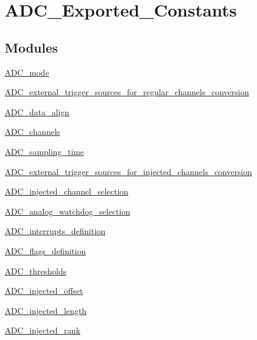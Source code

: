 \hypertarget{group___a_d_c___exported___constants}{\section{A\-D\-C\-\_\-\-Exported\-\_\-\-Constants}
\label{group___a_d_c___exported___constants}
}
\subsection*{Modules}
\begin{DoxyCompactItemize}
\item 
\hyperlink{group___a_d_c__mode}{A\-D\-C\-\_\-mode}
\item 
\hyperlink{group___a_d_c__external__trigger__sources__for__regular__channels__conversion}{A\-D\-C\-\_\-external\-\_\-trigger\-\_\-sources\-\_\-for\-\_\-regular\-\_\-channels\-\_\-conversion}
\item 
\hyperlink{group___a_d_c__data__align}{A\-D\-C\-\_\-data\-\_\-align}
\item 
\hyperlink{group___a_d_c__channels}{A\-D\-C\-\_\-channels}
\item 
\hyperlink{group___a_d_c__sampling__time}{A\-D\-C\-\_\-sampling\-\_\-time}
\item 
\hyperlink{group___a_d_c__external__trigger__sources__for__injected__channels__conversion}{A\-D\-C\-\_\-external\-\_\-trigger\-\_\-sources\-\_\-for\-\_\-injected\-\_\-channels\-\_\-conversion}
\item 
\hyperlink{group___a_d_c__injected__channel__selection}{A\-D\-C\-\_\-injected\-\_\-channel\-\_\-selection}
\item 
\hyperlink{group___a_d_c__analog__watchdog__selection}{A\-D\-C\-\_\-analog\-\_\-watchdog\-\_\-selection}
\item 
\hyperlink{group___a_d_c__interrupts__definition}{A\-D\-C\-\_\-interrupts\-\_\-definition}
\item 
\hyperlink{group___a_d_c__flags__definition}{A\-D\-C\-\_\-flags\-\_\-definition}
\item 
\hyperlink{group___a_d_c__thresholds}{A\-D\-C\-\_\-thresholds}
\item 
\hyperlink{group___a_d_c__injected__offset}{A\-D\-C\-\_\-injected\-\_\-offset}
\item 
\hyperlink{group___a_d_c__injected__length}{A\-D\-C\-\_\-injected\-\_\-length}
\item 
\hyperlink{group___a_d_c__injected__rank}{A\-D\-C\-\_\-injected\-\_\-rank}

\end{DoxyCompactItemize}
